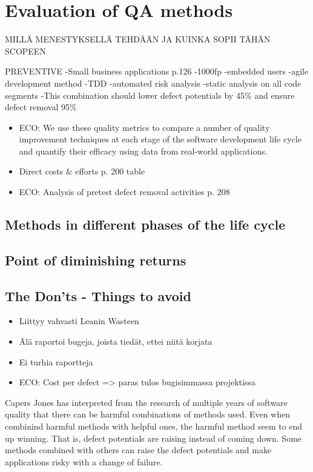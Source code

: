 
 \section{Evaluation of QA methods}
 
MILLÄ MENESTYKSELLÄ TEHDÄÄN JA KUINKA SOPII TÄHÄN SCOPEEN



PREVENTIVE
-Small business applications p.126
	-1000fp
	-embedded users
	-agile development method
	-TDD
	-automated risk analysis
	-static analysis on all code segments
	-This combination should lower defect potentials by 45\% and ensure defect removal 95\%




 \begin{itemize}
  
 \item ECO: We use these quality metrics to compare a number of quality improvement techniques at each stage of the software development life cycle and quantify their efficacy using data from real-world applications.
 
 \item Direct costs & efforts p. 200 table

 \item ECO: Analysis of pretest defect removal activities p. 208

 \end{itemize}
 
 \subsection{Methods in different phases of the life cycle}
 
 \subsection{Point of diminishing returns}
 
 \subsection{The Don'ts - Things to avoid}
 
 \begin{itemize}
 
 \item Liittyy vahvasti Leanin Wasteen
 \item Älä raportoi bugeja, joista tiedät, ettei niitä korjata
 \item Ei turhia raportteja
 \item ECO: Cost per defect => paras tulos bugisimmassa projektissa
 
 \end{itemize}


Capers Jones has interpreted from the research of multiple years of software quality that there can be harmful combinations of methods used. Even when combinind harmful methods with helpful ones, the harmful method seem to end up winning. That is, defect potentials are raising instead of coming down. Some methods combined with others can raise the defect potentials and make applications risky with a change of failure.
